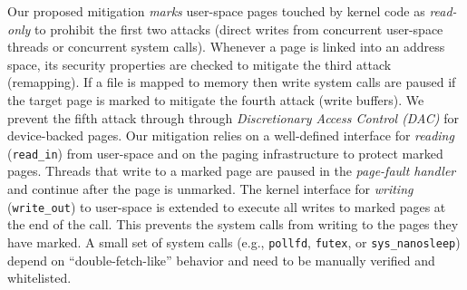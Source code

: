\documentclass[conference]{IEEEtran}
\begin{document}

Our proposed mitigation \emph{marks} user-space pages touched by kernel code as
\emph{read-only} to prohibit the first two attacks (direct writes from concurrent
user-space threads or concurrent system calls). Whenever a page is linked into
an address space, its security properties are checked to mitigate the
third attack (remapping). If a file is mapped to memory then write system calls
are paused if the target page is marked to mitigate the fourth attack (write
buffers). We prevent the fifth attack through
through \emph{Discretionary Access Control (DAC)} for device-backed pages.
%
Our mitigation relies on a well-defined interface for \emph{reading} (\texttt{read\_in})
from user-space and on the paging infrastructure to protect marked pages.
Threads that write to a marked page are paused in the
\emph{page-fault handler} and continue after the page is
unmarked. The kernel interface for \emph{writing} (\texttt{write\_out}) to
user-space is extended to execute all writes to marked pages at the end of the
call. This prevents the system calls from writing to the pages they have marked.
%
A small set of system calls (e.g., \texttt{pollfd}, \texttt{futex}, or
\texttt{sys\_nanosleep}) depend on ``double-fetch-like'' behavior and need to be
manually verified and whitelisted.

\end{document}
